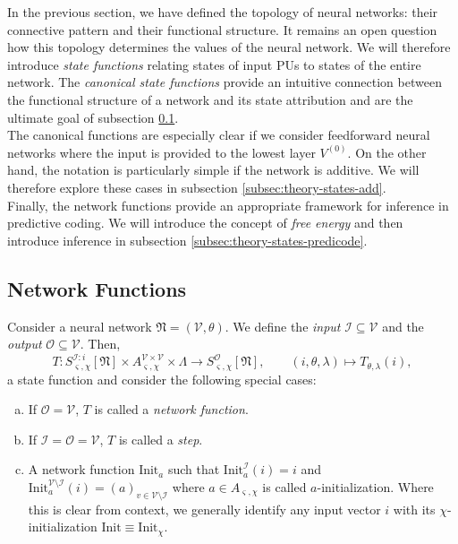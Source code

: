\documentclass[a4paper,11pt]{report}
\newcommand{\const}{\varsigma} %
\newcommand{\var}{\chi} %
\newcommand{\In}{\text{Init}}
\begin{document}
\begin{Par}
In the previous section, we have defined the topology of neural networks: their connective pattern and their functional structure. It remains an open question how this topology determines the values of the neural network. We will therefore introduce \emph{state functions} relating states of input PUs to states of the entire network. The \emph{canonical state functions} provide an intuitive connection between the functional structure of a network and its state attribution and are the ultimate goal of subsection \ref{subsec:theory-states-basics}.\\
The canonical functions are especially clear if we consider feedforward neural networks where the input is provided to the lowest layer $V^{(0)}$. On the other hand, the notation is particularly simple if the network is additive. We will therefore explore these cases in subsection \ref{subsec:theory-states-add}.\\
Finally, the network functions provide an appropriate framework for inference in predictive coding. We will introduce the concept of \emph{free energy} and then introduce inference in subsection \ref{subsec:theory-states-predicode}.
\end{Par}

\subsection{Network Functions}\label{subsec:theory-states-basics}

\begin{Def}
Consider a neural network $\mathfrak{N}=(\mathcal{V},\theta)$. We define the \emph{input} $\mathcal{I}\subseteq\mathcal{V}$ and the \emph{output} $\mathcal{O}\subseteq\mathcal{V}$. Then, 
\begin{equation}\label{eq:state-function}
T:S_{\const,\var}^{\mathcal{I}:i}[\mathfrak{N}]\times A_{\const,\var}^{\mathcal{V}\times\mathcal{V}}\times\Lambda\to S^{\mathcal{O}}_{\const,\var}[\mathfrak{N}],\qquad 
(i,\theta,\lambda)\mapsto T_{\theta,\lambda}(i),
\end{equation}
a state function and consider the following special cases:
\begin{enumerate}[a)]
\item
If $\mathcal{O}=\mathcal{V}$, $T$ is called a \emph{network function}.
\item
If $\mathcal{I}=\mathcal{O}=\mathcal{V}$, $T$ is called a \emph{step}.
\item
A network function $\In_a$ such that $\In_a^{\mathcal{I}}(i)=i$ and $\In_a^{\mathcal{V}\setminus\mathcal{I}}(i)=\left(a\right)_{v\in\mathcal{V}\setminus\mathcal{I}}$ where $a\in A_{\const,\var}$ is called $a$-initialization. Where this is clear from context, we generally identify any input vector $i$ with its $\var$-initialization $\In\equiv\In_{\var}$.
\end{enumerate}
\end{Def}
\end{document}

